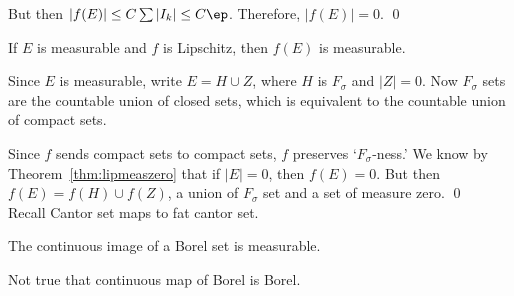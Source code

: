 
But then $|f(E)| \leq C \sum |I_k| \leq C\ep$. Therefore, $|f(E)|=0$. \qed \\


\begin{thm}
If $E$ is measurable and $f$ is Lipschitz, then $f(E)$ is measurable.
\end{thm}

\pf Since $E$ is measurable, write $E= H \cup Z$, where $H$ is $F_\sigma$ and $|Z|=0$. Now $F_\sigma$ sets are the countable union of closed sets, which is equivalent to the countable union of compact sets. 



Since $f$ sends compact sets to compact sets, $f$ preserves `$F_\sigma$-ness.' We know by Theorem~\ref{thm:lipmeaszero} that if $|E|=0$, then $f(E)=0$. But then $f(E)= f(H) \cup f(Z)$, a union of $F_\sigma$ set and a set of measure zero. \qed \\











Recall Cantor set maps to fat cantor set. 



\begin{thm}
The continuous image of a Borel set is measurable. 
\end{thm}



Not true that continuous map of Borel is Borel. 


